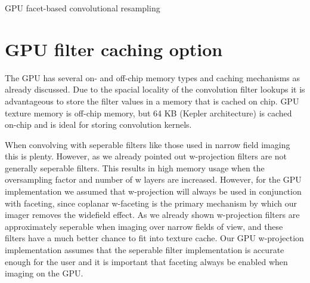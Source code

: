 \begin{algorithm}
\begin{algorithmic}
	    \ENDIF
	 \ENDIF
      \ENDFOR %
    \ENDFOR %
    \ENDIF
    \STATE {Let $u_\text{prev} = u_\text{int}, v_\text{prev} = v_\text{int}, (\forall x \in [0...N_\text{cross correlations}-1))vis_x = 0+0i$}
  \ENDFOR %
 \end{algorithmic}
 \caption{GPU facet-based convolutional resampling}
 \label{ALG_GRIDDING_GPU}
\end{algorithm}
\section{GPU filter caching option}
The GPU has several on- and off-chip memory types and caching mechanisms as already discussed. Due to the spacial locality of the convolution filter lookups it is advantageous to
store the filter values in a memory that is cached on chip. GPU texture memory is off-chip memory, but 64 KB (Kepler architecture) is 
cached on-chip and is ideal for storing convolution kernels. 

When convolving with seperable filters like those used in narrow field imaging this is plenty. However, as we already pointed out
w-projection filters are not generally seperable filters. This results in high memory usage when the oversampling factor and number of w layers are 
increased. However, for the GPU implementation we assumed that w-projection will always be used in conjunction with faceting, since coplanar w-faceting
is the primary mechanism by which our imager removes the widefield effect. As we already shown w-projection filters are approximately seperable when 
imaging over narrow fields of view, and these filters have a much better chance to fit into texture cache. Our GPU w-projection implementation
assumes that the seperable filter implementation is accurate enough for the user and it is important that faceting always be enabled when imaging on 
the GPU.

